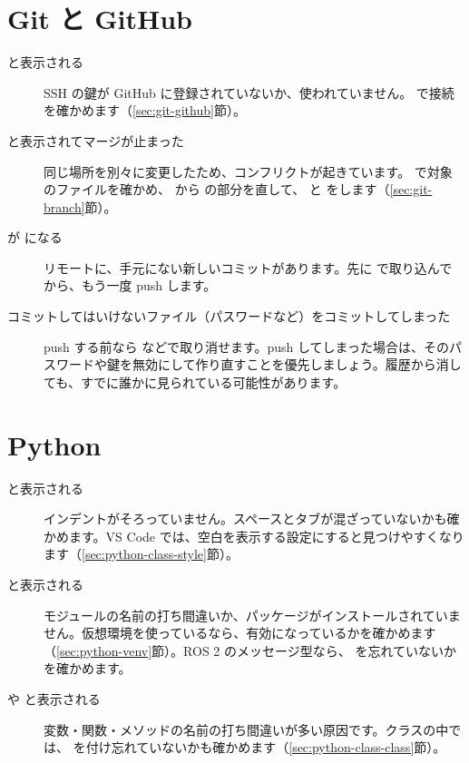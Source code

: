 \section{Git と GitHub}
\label{sec:troubleshooting-git}

\begin{description}
  \item[ と表示される] SSH の鍵が GitHub に登録されていないか、使われていません。 で接続を確かめます（\ref{sec:git-github}節）。
  \item[ と表示されてマージが止まった] 同じ場所を別々に変更したため、コンフリクトが起きています。 で対象のファイルを確かめ、\cmd{<<<<<<<} から \cmd{>>>>>>>} の部分を直して、 と  をします（\ref{sec:git-branch}節）。
  \item[ が  になる] リモートに、手元にない新しいコミットがあります。先に  で取り込んでから、もう一度 push します。
  \item[コミットしてはいけないファイル（パスワードなど）をコミットしてしまった] push する前なら  などで取り消せます。push してしまった場合は、そのパスワードや鍵を無効にして作り直すことを優先しましょう。履歴から消しても、すでに誰かに見られている可能性があります。
\end{description}

\section{Python}
\label{sec:troubleshooting-python}

\begin{description}
  \item[ と表示される] インデントがそろっていません。スペースとタブが混ざっていないかも確かめます。VS Code では、空白を表示する設定にすると見つけやすくなります（\ref{sec:python-class-style}節）。
  \item[ と表示される] モジュールの名前の打ち間違いか、パッケージがインストールされていません。仮想環境を使っているなら、有効になっているかを確かめます（\ref{sec:python-venv}節）。ROS 2 のメッセージ型なら、 を忘れていないかを確かめます。
  \item[ や  と表示される] 変数・関数・メソッドの名前の打ち間違いが多い原因です。クラスの中では、 を付け忘れていないかも確かめます（\ref{sec:python-class-class}節）。
\end{description}


